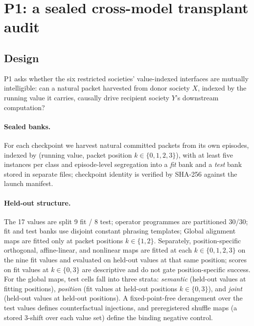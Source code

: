 \documentclass[11pt]{article}
\begin{document}
\section{P1: a sealed cross-model transplant audit}\label{sec:p1}

\subsection{Design}\label{sec:p1design}

P1 asks whether the six restricted societies' value-indexed interfaces are mutually intelligible: can a natural packet harvested from donor society $X$, indexed by the running value it carries, causally drive recipient society $Y$'s downstream computation?

\paragraph{Sealed banks.} For each checkpoint we harvest natural committed packets from its own episodes, indexed by (running value, packet position $k\in\{0,1,2,3\}$), with at least five instances per class and episode-level segregation into a \emph{fit} bank and a \emph{test} bank stored in separate files; checkpoint identity is verified by SHA-256 against the launch manifest.

\paragraph{Held-out structure.} The 17 values are split 9 fit / 8 test; operator programmes are partitioned 30/30; fit and test banks use disjoint constant phrasing templates; Global alignment maps are fitted only at packet positions $k\in\{1,2\}$. Separately, position-specific orthogonal, affine-linear, and nonlinear maps are fitted at each $k\in\{0,1,2,3\}$ on the nine fit values and evaluated on held-out values at that same position; scores on fit values at $k\in\{0,3\}$ are descriptive and do not gate position-specific success. For the global maps, test cells fall into three strata: \emph{semantic} (held-out values at fitting positions), \emph{position} (fit values at held-out positions $k\in\{0,3\}$), and \emph{joint} (held-out values at held-out positions). A fixed-point-free derangement over the test values defines counterfactual injections, and preregistered shuffle maps (a stored 3-shift over each value set) define the binding negative control.
\end{document}
